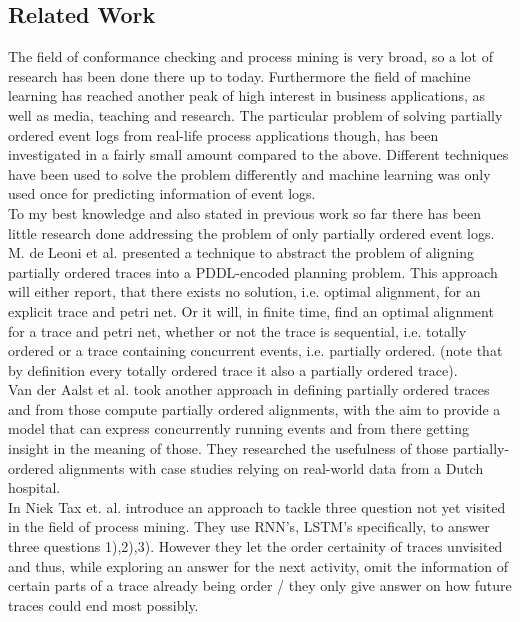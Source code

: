 \documentclass[
	a4paper,
	pagesize,
	pdftex,
	12pt,
	ngerman,
	fleqn,
	final,
	]{scrartcl}
\theoremstyle{plain}
\theoremstyle{definition}
\begin{document}
	\subsection{Related Work}
	The field of conformance checking and process mining is very broad, so a lot of research has been done there up to today. Furthermore the field of machine learning has reached another peak of high interest in business applications, as well as media, teaching and research. 
	The particular problem of solving partially ordered event logs from real-life process applications though, has been investigated in a fairly small amount compared to the above. 
	Different techniques have been used to solve the problem differently and machine learning was only used once for predicting information of event logs. \\
	To my best knowledge and also stated in previous work \cite{lu2014conformance} so far there has been little research done addressing the problem of only partially ordered event logs.\\
	M. de Leoni et al. presented a technique to abstract the problem of aligning partially ordered traces into a PDDL-encoded planning problem. This approach will either report, that there exists no solution, i.e. optimal alignment, for an explicit trace and petri net. Or it will, in finite time, find an optimal alignment for a trace and petri net, whether or not the trace is sequential, i.e. totally ordered or a trace containing concurrent events, i.e. partially ordered. (note that by definition every totally ordered trace it also a partially ordered trace).\cite{de2018aligning} \\
	Van der Aalst et al. took another approach in defining partially ordered traces and from those compute partially ordered alignments, with the aim to provide a model that can express concurrently running events and from there getting insight in the meaning of those. \cite{lu2014conformanceShort} They researched the usefulness of those partially-ordered alignments with case studies relying on real-world data from a Dutch hospital. \cite{lu2014conformance} \\
	In \cite{tax2017predictive} Niek Tax et. al. introduce an approach to tackle three question not yet visited in the field of process mining. They use RNN's, LSTM's specifically, to answer three questions 1),2),3). However they let the order certainity of traces unvisited and thus, while exploring an answer for the next activity, omit the information of certain parts of a trace already being order / they only give answer on how future traces could end most possibly. \\
\end{document}
